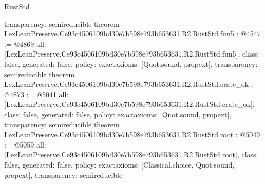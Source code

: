 \begin{lexlean}{RustStd}
\begin{coremodule}
{  transparency: semireducible
}
theorem LexLeanPreserve.Ce93c4506109bd30e7b598e793b653631.R2.RustStd.fun5 : @4547 := @4869 {
  all: [LexLeanPreserve.Ce93c4506109bd30e7b598e793b653631.R2.RustStd.fun5],
  class: false,
  generated: false,
  policy: exact{axioms: [Quot.sound, propext]},
  transparency: semireducible
}
theorem LexLeanPreserve.Ce93c4506109bd30e7b598e793b653631.R2.RustStd.crate_ok : @4873 := @5041 {
  all: [LexLeanPreserve.Ce93c4506109bd30e7b598e793b653631.R2.RustStd.crate_ok],
  class: false,
  generated: false,
  policy: exact{axioms: [Quot.sound, propext]},
  transparency: semireducible
}
theorem LexLeanPreserve.Ce93c4506109bd30e7b598e793b653631.R2.RustStd.root : @5049 := @5059 {
  all: [LexLeanPreserve.Ce93c4506109bd30e7b598e793b653631.R2.RustStd.root],
  class: false,
  generated: false,
  policy: exact{axioms: [Classical.choice, Quot.sound, propext]},
  transparency: semireducible
}


\end{coremodule}
\end{lexlean}
